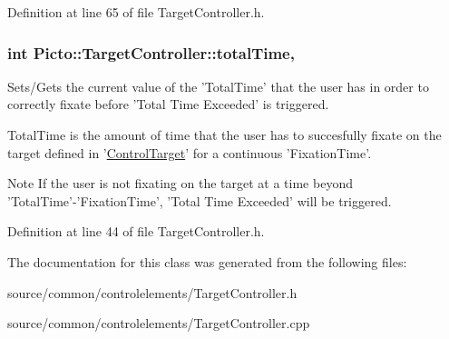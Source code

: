 Definition at line 65 of file Target\-Controller.\-h.

\hypertarget{class_picto_1_1_target_controller_aea2309b5882ce95be4712e93d1b3db23}{
\subsubsection[{total\-Time}]{\setlength{\rightskip}{0pt plus 5cm}int Picto\-::\-Target\-Controller\-::total\-Time\hspace{0.3cm}{\ttfamily [read]}, {\ttfamily [write]}}}\label{class_picto_1_1_target_controller_aea2309b5882ce95be4712e93d1b3db23}


Sets/\-Gets the current value of the 'Total\-Time' that the user has in order to correctly fixate before 'Total Time Exceeded' is triggered. 

Total\-Time is the amount of time that the user has to succesfully fixate on the target defined in '\hyperlink{class_picto_1_1_control_target}{Control\-Target}' for a continuous 'Fixation\-Time'. \begin{DoxyNote}{Note}
If the user is not fixating on the target at a time beyond 'Total\-Time'-\/'Fixation\-Time', 'Total Time Exceeded' will be triggered. 
\end{DoxyNote}


Definition at line 44 of file Target\-Controller.\-h.



The documentation for this class was generated from the following files\-:\begin{DoxyCompactItemize}
\item 
source/common/controlelements/Target\-Controller.\-h\item 
source/common/controlelements/Target\-Controller.\-cpp\end{DoxyCompactItemize}
